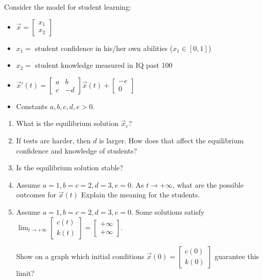 \newpage 

\begin{exercises}

	\begin{problist}
	\prob Consider the model for student learning:
	\begin{itemize}
		\item $\vec{x} = \begin{bmatrix} x_1 \\ x_2 \end{bmatrix}$
		\item $x_1=$ student confidence in his/her own abilities ($x_1 \in [0,1]$)
		\item $x_2=$ student knowledge measured in IQ past 100
		\item $\vec{x}'(t) =
		\begin{bmatrix}
			a & b \\
			c & - d 
		\end{bmatrix}
		\vec{x}(t)
		+ \begin{bmatrix}
 			-e \\ 0
 		\end{bmatrix}$
		\item Constants $a,b,c,d,e>0$.
	\end{itemize}
	\begin{enumerate}
		\item What is the equilibrium solution $\vec{x}_e$? 
		\item If tests are harder, then $d$ is larger. How does that affect the equilibrium confidence and knowledge of students?
		\item Is the equilibrium solution stable?
		\item Assume $a=1, b=c=2, d=3,e=0$. As $t \to +\infty$, what are the possible outcomes for $\vec{x}(t)$ Explain the meaning for the students.
		\item Assume $a=1, b=c=2, d=3,e=0$. Some solutions satisfy $\displaystyle \lim_{t \to +\infty} \begin{bmatrix}c(t) \\ k(t) \end{bmatrix} = \begin{bmatrix} + \infty \\ + \infty \end{bmatrix}$.

			Show on a graph which initial conditions $\vec{x}(0) = \begin{bmatrix}c(0) \\ k(0) \end{bmatrix}$ guarantee this limit?


\end{enumerate}
\end{problist}
\end{exercises}
